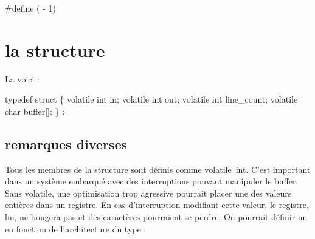 \documentclass{scrartcl}%
\begin{document}
\nwenddocs{}\plusendmoddef\nwstartdeflinemarkup{}\nwenddeflinemarkup
#define     ( - 1)

\nwendcode{}\nwdocspar
\section{la structure}
La voici :

\nwenddocs{}\endmoddef\nwstartdeflinemarkup\nwenddeflinemarkup

typedef struct \{
    volatile int in;
    volatile int out;
    volatile int line_count;
    volatile char buffer[];
\} ;

\nwendcode{}\nwdocspar
\subsection{remarques diverses}
Tous les membres de la structure sont définis comme {\Tt{}volatile\ int\nwendquote}. C'est important dans un système embarqué avec des interruptions pouvant manipuler le buffer. Sans {\Tt{}volatile\nwendquote}, une optimisation trop agressive pourrait placer une des valeurs entières dans un registre. En cas d'interruption modifiant cette valeur, le registre, lui, ne bougera pas et des caractères pourraient se perdre.
On pourrait définir un {\Tt{}\nwendquote} en fonction de l'architecture du type :
\end{document}
